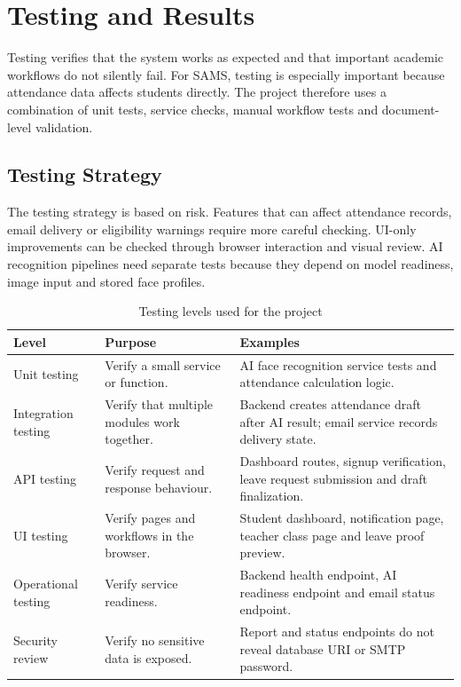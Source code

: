 \chapter{Testing and Results}
\label{chap:testing}

Testing verifies that the system works as expected and that important academic workflows do not silently fail. For SAMS, testing is especially important because attendance data affects students directly. The project therefore uses a combination of unit tests, service checks, manual workflow tests and document-level validation.

\section{Testing Strategy}

The testing strategy is based on risk. Features that can affect attendance records, email delivery or eligibility warnings require more careful checking. UI-only improvements can be checked through browser interaction and visual review. AI recognition pipelines need separate tests because they depend on model readiness, image input and stored face profiles.

\begin{table}[H]
\centering
\caption{Testing levels used for the project}
\label{tab:testing-levels}
\begin{tabularx}{\textwidth}{p{3cm} X X}
\toprule
\textbf{Level} & \textbf{Purpose} & \textbf{Examples}\\
\midrule
Unit testing & Verify a small service or function. & AI face recognition service tests and attendance calculation logic.\\
Integration testing & Verify that multiple modules work together. & Backend creates attendance draft after AI result; email service records delivery state.\\
API testing & Verify request and response behaviour. & Dashboard routes, signup verification, leave request submission and draft finalization.\\
UI testing & Verify pages and workflows in the browser. & Student dashboard, notification page, teacher class page and leave proof preview.\\
Operational testing & Verify service readiness. & Backend health endpoint, AI readiness endpoint and email status endpoint.\\
Security review & Verify no sensitive data is exposed. & Report and status endpoints do not reveal database URI or SMTP password.\\
\bottomrule
\end{tabularx}
\end{table}

